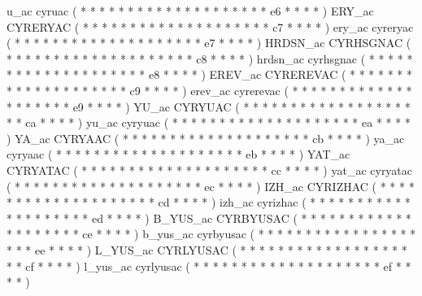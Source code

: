 \makecod u_ac         cyruac            ( *  *       *  *   *  *  *  *     *  *  *  *  *     *  *  *  *     *  *  *     e6  *  *    *  *   )
\makeCOD ERY_ac       CYRERYAC          ( *  *       *  *   *  *  *  *     *  *  *  *  *     *  *  *  *     *  *  *     c7  *  *    *  *   )
\makecod ery_ac       cyreryac          ( *  *       *  *   *  *  *  *     *  *  *  *  *     *  *  *  *     *  *  *     e7  *  *    *  *   )
\makeCOD HRDSN_ac     CYRHSGNAC         ( *  *       *  *   *  *  *  *     *  *  *  *  *     *  *  *  *     *  *  *     c8  *  *    *  *   )
\makecod hrdsn_ac     cyrhsgnac         ( *  *       *  *   *  *  *  *     *  *  *  *  *     *  *  *  *     *  *  *     e8  *  *    *  *   )
\makeCOD EREV_ac      CYREREVAC         ( *  *       *  *   *  *  *  *     *  *  *  *  *     *  *  *  *     *  *  *     c9  *  *    *  *   )
\makecod erev_ac      cyrerevac         ( *  *       *  *   *  *  *  *     *  *  *  *  *     *  *  *  *     *  *  *     e9  *  *    *  *   )
\makeCOD YU_ac        CYRYUAC           ( *  *       *  *   *  *  *  *     *  *  *  *  *     *  *  *  *     *  *  *     ca  *  *    *  *   )
\makecod yu_ac        cyryuac           ( *  *       *  *   *  *  *  *     *  *  *  *  *     *  *  *  *     *  *  *     ea  *  *    *  *   )
\makeCOD YA_ac        CYRYAAC           ( *  *       *  *   *  *  *  *     *  *  *  *  *     *  *  *  *     *  *  *     cb  *  *    *  *   )
\makecod ya_ac        cyryaac           ( *  *       *  *   *  *  *  *     *  *  *  *  *     *  *  *  *     *  *  *     eb  *  *    *  *   )
\makeCOD YAT_ac       CYRYATAC          ( *  *       *  *   *  *  *  *     *  *  *  *  *     *  *  *  *     *  *  *     cc  *  *    *  *   )
\makecod yat_ac       cyryatac          ( *  *       *  *   *  *  *  *     *  *  *  *  *     *  *  *  *     *  *  *     ec  *  *    *  *   )
\makeCOD IZH_ac       CYRIZHAC          ( *  *       *  *   *  *  *  *     *  *  *  *  *     *  *  *  *     *  *  *     cd  *  *    *  *   )
\makecod izh_ac       cyrizhac          ( *  *       *  *   *  *  *  *     *  *  *  *  *     *  *  *  *     *  *  *     ed  *  *    *  *   )
\makeCOD B_YUS_ac     CYRBYUSAC         ( *  *       *  *   *  *  *  *     *  *  *  *  *     *  *  *  *     *  *  *     ce  *  *    *  *   )
\makecod b_yus_ac     cyrbyusac         ( *  *       *  *   *  *  *  *     *  *  *  *  *     *  *  *  *     *  *  *     ee  *  *    *  *   )
\makeCOD L_YUS_ac     CYRLYUSAC         ( *  *       *  *   *  *  *  *     *  *  *  *  *     *  *  *  *     *  *  *     cf  *  *    *  *   )
\makecod l_yus_ac     cyrlyusac         ( *  *       *  *   *  *  *  *     *  *  *  *  *     *  *  *  *     *  *  *     ef  *  *    *  *   )
